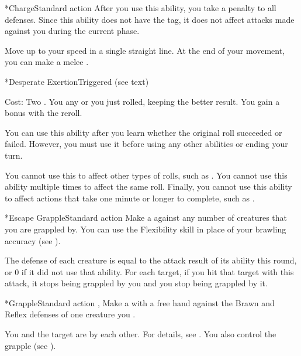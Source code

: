   \begin{activeability}*{Charge}{Standard action}
    \rankline
    After you use this ability, you  take a  penalty to all defenses.
    Since this ability does not have the  tag, it does not affect attacks made against you during the current phase.

    Move up to your speed in a single straight line.
    At the end of your movement, you can make a melee .
  \end{activeability}

  \begin{activeability}*{Desperate Exertion}{Triggered (see text)}
    \par \noindent Cost: Two .
    \rankline
    You  any  or  you just rolled, keeping the better result.
    You gain a  bonus with the reroll.

    You can use this ability after you learn whether the original roll succeeded or failed.
    However, you must use it before using any other abilities or ending your turn.

    You cannot use this to affect other types of rolls, such as .
    You cannot use this ability multiple times to affect the same roll.
    Finally, you cannot use this ability to affect actions that take one minute or longer to complete, such as .
  \end{activeability}

  \begin{activeability}*{Escape Grapple}{Standard action}
    \abilitytags {}
    \rankline
    Make a  against any number of creatures that you are grappled by.
    You can use the Flexibility skill in place of your brawling accuracy (see ).

    The defense of each creature is equal to the attack result of its  ability this round, or 0 if it did not use that ability.
    For each target, if you hit that target with this attack, it stops being grappled by you and you stop being grappled by it.
  \end{activeability}

  \begin{activeability}*{Grapple}{Standard action}
    \abilitytags {}, 
    \rankline
    Make a  with a free hand against the Brawn and Reflex defenses of one creature you .

    \hit You and the target are \grappled by each other.
    For details, see .
    \crit You also control the grapple (see ).
  \end{activeability}


